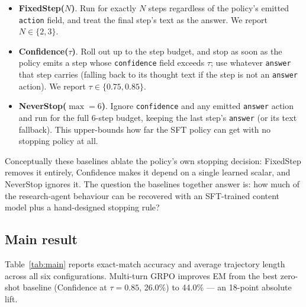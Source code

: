 \documentclass[11pt]{article}
\begin{document}
\begin{itemize}
  \item \textbf{FixedStep($N$)}. Run for exactly $N$ steps regardless
  of the policy's emitted \texttt{action} field, and treat the final
  step's text as the answer. We report $N \in \{2, 3\}$.
  \item \textbf{Confidence($\tau$)}. Roll out up to the step budget,
  and stop as soon as the policy emits a step whose \texttt{confidence}
  field exceeds $\tau$; use whatever \texttt{answer} that step carries
  (falling back to its thought text if the step is not an
  \texttt{answer} action). We report $\tau \in \{0.75, 0.85\}$.
  \item \textbf{NeverStop($\max=6$)}. Ignore \texttt{confidence} and
  any emitted \texttt{answer} action and run for the full 6-step
  budget, keeping the last step's \texttt{answer} (or its text
  fallback). This upper-bounds how far the SFT policy can get with
  no stopping policy at all.
\end{itemize}

Conceptually these baselines ablate the policy's own stopping
decision: FixedStep removes it entirely, Confidence makes it depend
on a single learned scalar, and NeverStop ignores it. The question
the baselines together answer is: how much of the research-agent
behaviour can be recovered with an SFT-trained content model plus a
hand-designed stopping rule?

\subsection{Main result}
\label{sec:main-result}

Table~\ref{tab:main} reports exact-match accuracy and average
trajectory length across all six configurations. Multi-turn GRPO
improves EM from the best zero-shot baseline (Confidence at
$\tau{=}0.85$, 26.0\%) to 44.0\% --- an 18-point absolute lift.
\end{document}

